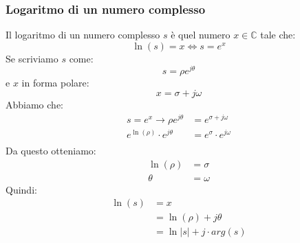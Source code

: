 \documentclass[a4paper]{article}
\begin{document}
\subsubsection{Logaritmo di un numero complesso}
Il logaritmo di un numero complesso \( s \) è quel numero \( x \in \mathbb{C} \) 
tale che:
\[
  \ln(s) = x \iff s = e^x
\] 
Se scriviamo \( s \) come:
\[
  s = \rho e^{j \theta}
\] 
e \( x \) in forma polare:
\[
x = \sigma + j \omega
\] 
Abbiamo che:
\[
  \begin{aligned}
    s = e^x \to \rho e^{j \theta} &= e^{\sigma + j \omega}\\
    e^{\ln(\rho)} \cdot e^{j \theta} &= e^{\sigma} \cdot e^{j \omega}\\
  \end{aligned}
\] 
Da questo otteniamo:
\[
\begin{aligned}
  \ln(\rho) &= \sigma\\
  \theta &= \omega
\end{aligned}
\] 
Quindi:
\[
\begin{aligned}
  \ln(s) &= x\\
         &= \ln(\rho) + j \theta\\
         &= \ln \left| s \right| + j \cdot arg(s)
\end{aligned}
\] 
\end{document}
